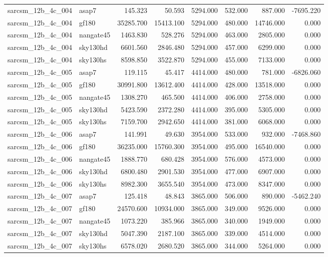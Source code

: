 \begin{tabular}{llrrrrrr}
sarcsm\_12b\_4c\_004 & asap7 & 145.323 & 50.593 & 5294.000 & 532.000 & 887.000 & -7695.220 \\
sarcsm\_12b\_4c\_004 & gf180 & 35285.700 & 15413.100 & 5294.000 & 480.000 & 14746.000 & 0.000 \\
sarcsm\_12b\_4c\_004 & nangate45 & 1463.830 & 528.276 & 5294.000 & 463.000 & 2805.000 & 0.000 \\
sarcsm\_12b\_4c\_004 & sky130hd & 6601.560 & 2846.480 & 5294.000 & 457.000 & 6299.000 & 0.000 \\
sarcsm\_12b\_4c\_004 & sky130hs & 8598.850 & 3522.870 & 5294.000 & 455.000 & 7133.000 & 0.000 \\
sarcsm\_12b\_4c\_005 & asap7 & 119.115 & 45.417 & 4414.000 & 480.000 & 781.000 & -6826.060 \\
sarcsm\_12b\_4c\_005 & gf180 & 30991.800 & 13612.400 & 4414.000 & 428.000 & 13518.000 & 0.000 \\
sarcsm\_12b\_4c\_005 & nangate45 & 1308.270 & 465.500 & 4414.000 & 406.000 & 2758.000 & 0.000 \\
sarcsm\_12b\_4c\_005 & sky130hd & 5423.590 & 2372.280 & 4414.000 & 395.000 & 5305.000 & 0.000 \\
sarcsm\_12b\_4c\_005 & sky130hs & 7159.700 & 2942.650 & 4414.000 & 381.000 & 6068.000 & 0.000 \\
sarcsm\_12b\_4c\_006 & asap7 & 141.991 & 49.630 & 3954.000 & 533.000 & 932.000 & -7468.860 \\
sarcsm\_12b\_4c\_006 & gf180 & 36235.000 & 15760.300 & 3954.000 & 495.000 & 16540.000 & 0.000 \\
sarcsm\_12b\_4c\_006 & nangate45 & 1888.770 & 680.428 & 3954.000 & 576.000 & 4573.000 & 0.000 \\
sarcsm\_12b\_4c\_006 & sky130hd & 6800.480 & 2901.530 & 3954.000 & 477.000 & 6907.000 & 0.000 \\
sarcsm\_12b\_4c\_006 & sky130hs & 8982.300 & 3655.540 & 3954.000 & 473.000 & 8347.000 & 0.000 \\
sarcsm\_12b\_4c\_007 & asap7 & 125.418 & 48.843 & 3865.000 & 506.000 & 890.000 & -5462.240 \\
sarcsm\_12b\_4c\_007 & gf180 & 24570.600 & 10934.000 & 3865.000 & 349.000 & 9526.000 & 0.000 \\
sarcsm\_12b\_4c\_007 & nangate45 & 1073.220 & 385.966 & 3865.000 & 340.000 & 1949.000 & 0.000 \\
sarcsm\_12b\_4c\_007 & sky130hd & 5047.390 & 2187.100 & 3865.000 & 339.000 & 4514.000 & 0.000 \\
sarcsm\_12b\_4c\_007 & sky130hs & 6578.020 & 2680.520 & 3865.000 & 344.000 & 5264.000 & 0.000 \\

\end{tabular}
